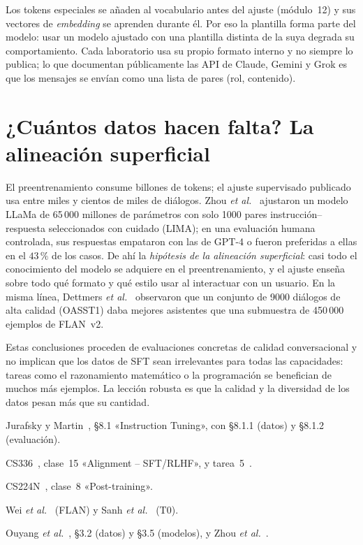 \begin{observacion}
Los tokens especiales se añaden al vocabulario antes del ajuste (módulo~12) y sus vectores de \emph{embedding} se aprenden durante él. Por eso la plantilla forma parte del modelo: usar un modelo ajustado con una plantilla distinta de la suya degrada su comportamiento. Cada laboratorio usa su propio formato interno y no siempre lo publica; lo que documentan públicamente las API de Claude, Gemini y Grok es que los mensajes se envían como una lista de pares (rol, contenido).
\end{observacion}

\section{¿Cuántos datos hacen falta? La alineación superficial}

El preentrenamiento consume billones de tokens; el ajuste supervisado publicado usa entre miles y cientos de miles de diálogos. Zhou \emph{et al.}~\cite{zhou-lima} ajustaron un modelo LLaMa de 65\,000 millones de parámetros con solo 1000 pares instrucción--respuesta seleccionados con cuidado (LIMA); en una evaluación humana controlada, sus respuestas empataron con las de GPT-4 o fueron preferidas a ellas en el $43\,\%$ de los casos. De ahí la \emph{hipótesis de la alineación superficial}: casi todo el conocimiento del modelo se adquiere en el preentrenamiento, y el ajuste enseña sobre todo qué formato y qué estilo usar al interactuar con un usuario. En la misma línea, Dettmers \emph{et al.}~\cite[§1]{dettmers} observaron que un conjunto de 9000 diálogos de alta calidad (OASST1) daba mejores asistentes que una submuestra de 450\,000 ejemplos de FLAN~v2.

\begin{observacion}
Estas conclusiones proceden de evaluaciones concretas de calidad conversacional y no implican que los datos de SFT sean irrelevantes para todas las capacidades: tareas como el razonamiento matemático o la programación se benefician de muchos más ejemplos. La lección robusta es que la calidad y la diversidad de los datos pesan más que su cantidad.
\end{observacion}

\begin{lecturas}
\item Jurafsky y Martin~\cite{jm3}, §8.1 «Instruction Tuning», con §8.1.1 (datos) y §8.1.2 (evaluación).
\item CS336~\cite{cs336}, clase~15 «Alignment -- SFT/RLHF», y tarea~5~\cite[§4]{cs336a5}.
\item CS224N~\cite{cs224n}, clase~8 «Post-training».
\item Wei \emph{et al.}~\cite{wei-flan} (FLAN) y Sanh \emph{et al.}~\cite{sanh-t0} (T0).
\item Ouyang \emph{et al.}~\cite{ouyang}, §3.2 (datos) y §3.5 (modelos), y Zhou \emph{et al.}~\cite{zhou-lima}.
\end{lecturas}

